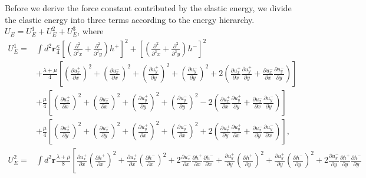 \documentclass[aps,prx,10pt,twocolumn,superscriptaddress]{revtex4}
\begin{document}
\begin{widetext}
Before we derive the force constant contributed by the elastic energy, we divide the elastic energy into three terms according to the energy hierarchy. $U_{E}=U^{1}_{E}+U^{2}_{E}+U^{3}_{E}$, where
\allowdisplaybreaks
\begin{align}
U^{1}_{E}=&\int d^{2}\textbf{r} \frac{\kappa}{4}\left[ \left( \frac{\partial^{2} }{\partial^{2} x}+\frac{\partial^{2} }{\partial^{2} y} \right) h^{+} \right]^{2} + \left[ \left( \frac{\partial^{2} }{\partial^{2} x}+\frac{\partial^{2} }{\partial^{2} y} \right) h^{-} \right]^{2}\nonumber \\
&+\frac{\lambda+\mu}{4}\left[ \left( \frac{\partial u^{+}_{x}}{\partial x} \right)^{2} + \left( \frac{\partial u^{-}_{x}}{\partial x} \right)^{2} + \left( \frac{\partial u^{+}_{y}}{\partial y} \right)^{2} + \left( \frac{\partial u^{-}_{y}}{\partial y} \right)^{2} +2\left( \frac{\partial u^{+}_{x}}{\partial x}\frac{\partial u^{+}_{y}}{\partial y}+\frac{\partial u^{-}_{x}}{\partial x}\frac{\partial u^{-}_{y}}{\partial y} \right) \right]\nonumber\\
&+\frac{\mu}{4}\left[  \left( \frac{\partial u^{+}_{x}}{\partial x} \right)^{2} + \left( \frac{\partial u^{-}_{x}}{\partial x} \right)^{2} + \left( \frac{\partial u^{+}_{y}}{\partial y} \right)^{2} + \left( \frac{\partial u^{-}_{y}}{\partial y} \right)^{2} -2\left( \frac{\partial u^{+}_{x}}{\partial x}\frac{\partial u^{+}_{y}}{\partial y}+\frac{\partial u^{-}_{x}}{\partial x}\frac{\partial u^{-}_{y}}{\partial y} \right) \right]\nonumber\\
&+\frac{\mu}{4}\left[ \left( \frac{\partial u^{+}_{x}}{\partial y} \right)^{2} + \left( \frac{\partial u^{-}_{x}}{\partial y} \right)^{2} + \left( \frac{\partial u^{+}_{y}}{\partial x} \right)^{2} + \left( \frac{\partial u^{-}_{y}}{\partial x} \right)^{2} +2\left( \frac{\partial u^{+}_{x}}{\partial y}\frac{\partial u^{+}_{y}}{\partial x}+\frac{\partial u^{-}_{x}}{\partial y}\frac{\partial u^{-}_{y}}{\partial x} \right) \right], \nonumber\\
U^{2}_{E}=&\int d^{2}\textbf{r}\frac{\lambda+\mu}{8}\left[  \frac{\partial u^{+}_{x}}{\partial x} \left( \frac{\partial h^{+}}{\partial x}\right)^2 +  \frac{\partial u^{+}_{x}}{\partial x} \left( \frac{\partial h^{-}}{\partial x}\right)^2 + 2 \frac{\partial u^{-}_{x}}{\partial x}  \frac{\partial h^{+}}{\partial x}\frac{\partial h^{-}}{\partial x} +  \frac{\partial u^{+}_{y}}{\partial y} \left( \frac{\partial h^{+}}{\partial y}\right)^2 +  \frac{\partial u^{+}_{y}}{\partial y} \left( \frac{\partial h^{-}}{\partial y}\right)^2 + 2 \frac{\partial u^{-}_{y}}{\partial y}  \frac{\partial h^{+}}{\partial y}\frac{\partial h^{-}}{\partial y}\right.\nonumber \\

\end{align}
\end{widetext}
\end{document}
